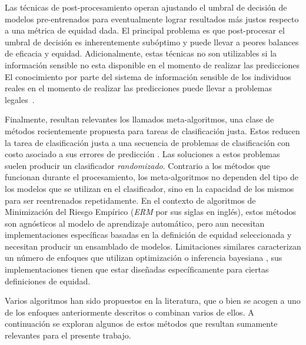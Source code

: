 Las técnicas de post-procesamiento operan ajustando el umbral de decisión de modelos pre-entrenados para eventualmente lograr resultados más justos respecto a una métrica de equidad dada.
El principal problema es que post-procesar el umbral de decisión es inherentemente subóptimo y puede llevar a peores balances de eficacia y equidad.
Adicionalmente, estas técnicas no son utilizables si la información sensible no esta disponible en el momento de realizar las predicciones
El conocimiento por parte del sistema de información sensible de los individuos reales en el momento de realizar las predicciones puede llevar a problemas legales~\parencite{MacCarthy2018StandardsOF}.

Finalmente, resultan relevantes los llamados meta-algoritmos, una clase de métodos recientemente propuesta para tareas de clasificación justa.
Estos reducen la tarea de clasificación justa a una secuencia de problemas de clasificación con costo asociado a sus errores de predicción \parencite{agarwal2018reductions, agarwal2019fair, kearns2018preventing}.
Las soluciones a estos problemas suelen producir un clasificador \emph{randomizado}. Contrario a los métodos que funcionan durante el procesamiento, los meta-algoritmos no dependen del tipo de los modelos que se utilizan en el clasificador, sino en la capacidad de los mismos para ser reentrenados repetidamente.
En el contexto de algoritmos de Minimización del Riesgo Empírico (\emph{ERM} por sus siglas en inglés), estos métodos son agnósticos al modelo de aprendizaje automático, pero aun necesitan implementaciones específicas basadas en la definición de equidad seleccionada y necesitan producir un ensamblado de modelos. Limitaciones similares caracterizan un número de enfoques que utilizan optimización \parencite{chiappa2018causal,Dimitrakakis_Liu_Parkes_Radanovic_2019} o inferencia bayesiana \parencite{kearns2018preventing,thomas2019preventing}, sus implementaciones tienen que estar diseñadas específicamente para ciertas definiciones de equidad.

Varios algoritmos han sido propuestos en la literatura, que o bien se acogen a uno de los enfoques anteriormente descritos o combinan varios de ellos.
A continuación se exploran algunos de estos métodos que resultan sumamente relevantes para el presente trabajo.

